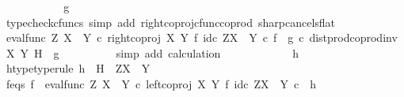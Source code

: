 \begin{isabellebody}
\ \ \ \ \ \ \isamarkupfalse%
\ \isamarkupfalse%
\ {\isachardoublequoteopen}{\isachardot}{\kern0pt}{\isachardot}{\kern0pt}{\isachardot}{\kern0pt}\ {\isacharequal}{\kern0pt}\ g{\isachardoublequoteclose}\isanewline
\ \ \ \ \ \ \ \ \isamarkupfalse%
\ {\isacharparenleft}{\kern0pt}typecheck{\isacharunderscore}{\kern0pt}cfuncs{\isacharcomma}{\kern0pt}\ simp\ add{\isacharcolon}{\kern0pt}\ right{\isacharunderscore}{\kern0pt}coproj{\isacharunderscore}{\kern0pt}cfunc{\isacharunderscore}{\kern0pt}coprod\ sharp{\isacharunderscore}{\kern0pt}cancels{\isacharunderscore}{\kern0pt}flat{\isacharparenright}{\kern0pt}\isanewline
\ \ \ \ \ \ \isamarkupfalse%
\ \isamarkupfalse%
\ {\isachardoublequoteopen}{\isacharparenleft}{\kern0pt}eval{\isacharunderscore}{\kern0pt}func\ Z\ {\isacharparenleft}{\kern0pt}X\ {\isasymCoprod}\ Y{\isacharparenright}{\kern0pt}\ {\isasymcirc}\isactrlsub c\ right{\isacharunderscore}{\kern0pt}coproj\ X\ Y\ {\isasymtimes}\isactrlsub f\ id\isactrlsub c\ {\isacharparenleft}{\kern0pt}Z\isactrlbsup {\isacharparenleft}{\kern0pt}X\ {\isasymCoprod}\ Y{\isacharparenright}{\kern0pt}\isactrlesup {\isacharparenright}{\kern0pt}{\isacharparenright}{\kern0pt}\isactrlsup {\isasymsharp}\ {\isasymcirc}\isactrlsub c\ {\isacharparenleft}{\kern0pt}f\isactrlsup {\isasymflat}\ {\isasymamalg}\ g\isactrlsup {\isasymflat}\ {\isasymcirc}\isactrlsub c\ dist{\isacharunderscore}{\kern0pt}prod{\isacharunderscore}{\kern0pt}coprod{\isacharunderscore}{\kern0pt}inv{}\ X\ Y\ H{\isacharparenright}{\kern0pt}\isactrlsup {\isasymsharp}\ {\isacharequal}{\kern0pt}\ g{\isachardoublequoteclose}\isanewline
\ \ \ \ \ \ \ \ \isamarkupfalse%
\ {\isacharparenleft}{\kern0pt}simp\ add{\isacharcolon}{\kern0pt}\ calculation{\isacharparenright}{\kern0pt}\isanewline
\ \ \ \ \isamarkupfalse%
\isanewline
\ \ \ \ \ \ \isamarkupfalse%
\ h\ \isanewline
\ \ \ \ \ \ \isamarkupfalse%
\ h{\isacharunderscore}{\kern0pt}type{\isacharbrackleft}{\kern0pt}type{\isacharunderscore}{\kern0pt}rule{\isacharbrackright}{\kern0pt}{\isacharcolon}{\kern0pt}\ {\isachardoublequoteopen}h\ {\isacharcolon}{\kern0pt}\ H\ {\isasymrightarrow}\ Z\isactrlbsup {\isacharparenleft}{\kern0pt}X\ {\isasymCoprod}\ Y{\isacharparenright}{\kern0pt}\isactrlesup {\isachardoublequoteclose}\isanewline
\ \ \ \ \ \ \isamarkupfalse%
\ f{\isacharunderscore}{\kern0pt}eqs{\isacharcolon}{\kern0pt}\ {\isachardoublequoteopen}f\ {\isacharequal}{\kern0pt}\ {\isacharparenleft}{\kern0pt}eval{\isacharunderscore}{\kern0pt}func\ Z\ {\isacharparenleft}{\kern0pt}X\ {\isasymCoprod}\ Y{\isacharparenright}{\kern0pt}\ {\isasymcirc}\isactrlsub c\ left{\isacharunderscore}{\kern0pt}coproj\ X\ Y\ {\isasymtimes}\isactrlsub f\ id\isactrlsub c\ {\isacharparenleft}{\kern0pt}Z\isactrlbsup {\isacharparenleft}{\kern0pt}X\ {\isasymCoprod}\ Y{\isacharparenright}{\kern0pt}\isactrlesup {\isacharparenright}{\kern0pt}{\isacharparenright}{\kern0pt}\isactrlsup {\isasymsharp}\ {\isasymcirc}\isactrlsub c\ \ h{\isachardoublequoteclose}\isanewline

\end{isabellebody}
